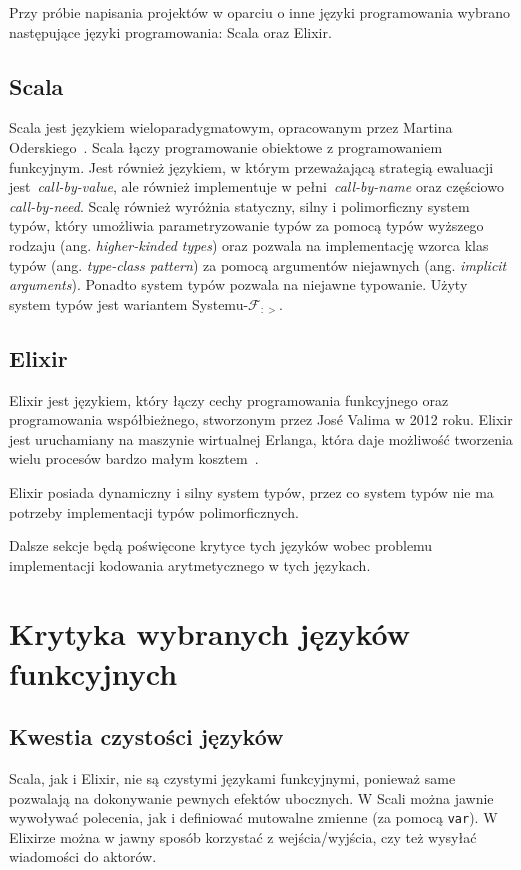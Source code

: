 \documentclass[../praca.tex]{subfiles}
\begin{document}
Przy próbie napisania projektów w oparciu o inne języki programowania wybrano
następujące języki programowania: Scala oraz Elixir. 

\subsection{Scala}

Scala jest językiem wieloparadygmatowym, opracowanym przez 
Martina Oderskiego~\cite{Odersky:BHS}. Scala łączy programowanie
obiektowe z programowaniem funkcyjnym. Jest również językiem,
w którym przeważającą strategią ewaluacji jest~\emph{call-by-value},
ale również implementuje w pełni~\emph{call-by-name} oraz częściowo
\emph{call-by-need}. Scalę również wyróżnia statyczny, silny i polimorficzny system typów,
który umożliwia parametryzowanie typów za pomocą typów wyższego rodzaju
(ang. \emph{higher-kinded types}) oraz pozwala na implementację
wzorca klas typów (ang. \emph{type-class pattern}) za pomocą
argumentów niejawnych (ang. \emph{implicit arguments}). Ponadto
system typów pozwala na niejawne typowanie. Użyty system typów
jest wariantem Systemu-\(\mathcal{F}_{:>}\).

\subsection{Elixir}

Elixir jest językiem, który łączy cechy programowania funkcyjnego
oraz programowania współbieżnego, stworzonym przez Jos{\' e} Valima
w 2012 roku. Elixir jest uruchamiany na maszynie wirtualnej Erlanga,
która daje możliwość tworzenia wielu procesów bardzo małym 
kosztem~\cite{Juric:EiA}.

Elixir posiada dynamiczny i silny system typów, przez co system typów
nie ma potrzeby implementacji typów polimorficznych.

Dalsze sekcje będą poświęcone krytyce tych języków wobec problemu implementacji
kodowania arytmetycznego w tych językach.

\section{Krytyka wybranych języków funkcyjnych}

\subsection{Kwestia czystości języków}

Scala, jak i Elixir, nie są czystymi językami funkcyjnymi, ponieważ
same pozwalają na dokonywanie pewnych efektów ubocznych. W Scali
można jawnie wywoływać polecenia, jak i definiować mutowalne zmienne
(za pomocą \texttt{var}). W Elixirze można w jawny sposób
korzystać z wejścia/wyjścia, czy też wysyłać wiadomości do aktorów.
\end{document}
